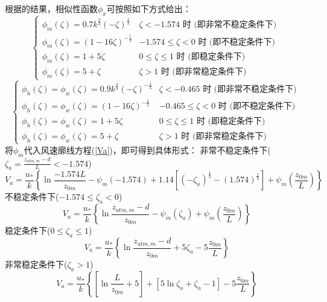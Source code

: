 根据\citet{zeng1998effect}的结果，相似性函数$\phi_x$可按照如下方式给出：
\begin{equation}
\left\{\begin{array}{lr}\phi_{m}(\zeta)=0.7 k^{\frac{2}{3}}(-\zeta)^{\frac{1}{3}} & \zeta<-1.574 \text { 时 (即非常不稳定条件下) } \\
      \phi_{m}(\zeta)=(1-16 \zeta)^{-\frac{1}{4}} & -1.574 \leq \zeta<0 \text { 时 (即不稳定条件下) } \\
       \phi_{m}(\zeta)=1+5 \zeta & 0 \leq \zeta \leq 1 \text { 时 (即稳定条件下) } \\ 
       \phi_{m}(\zeta)=5+\zeta & \zeta>1 \text { 时 (即非常稳定条件下) }\end{array}\right.
\end{equation}
\begin{equation}
\left\{\begin{array}{lr}\phi_{h}(\zeta)=\phi_{w}(\zeta)=0.9 k^{\frac{4}{3}}(-\zeta)^{-\frac{1}{3}} & \zeta<-0.465 \text { 时 (即非常不稳定条件下) } \\ 
     \phi_{h}(\zeta)=\phi_{w}(\zeta)=(1-16 \zeta)^{-\frac{1}{2}} & -0.465 \leq \zeta<0 \text { 时 (即不稳定条件下) } \\ 
     \phi_{h}(\zeta)=\phi_{w}(\zeta)=1+5 \zeta & 0 \leq \zeta \leq 1 \text { 时 (即稳定条件下) } \\
      \phi_{h}(\zeta)=\phi_{w}(\zeta)=5+\zeta & \zeta>1 \text { 时 (即非常稳定条件下) }\end{array}\right.
\end{equation}
将$\phi_m$代入风速廓线方程(\ref{Va})，即可得到具体形式：
非常不稳定条件下($\zeta_a=\frac{z_{atm,m}-d}{L}<-1.574$)
\begin{equation}
V_{a}=\frac{u_{*}}{k}\left\{\ln \frac{-1.574 L}{z_{0 m}}-\psi_{m}(-1.574)+
1.14\left[\left(-\zeta_{a}\right)^{\frac{1}{3}}-(1.574)^{\frac{1}{3}}\right]+\psi_{m}\left(\frac{z_{0 m}}{L}\right)\right\}
\end{equation}
不稳定条件下($-1.574\le\zeta_a<0$)
\begin{equation}
V_{a}=\frac{u_{*}}{k}\left\{\ln \frac{z_{atm, m}-d}{z_{0 m}}-\psi_{m}\left(\zeta_{a}\right)+\psi_{m}\left(\frac{z_{0 m}}{L}\right)\right\}
\end{equation}
稳定条件下($0\le\zeta_a\le1$)
\begin{equation}
V_{a}=\frac{u_{*}}{k}\left\{\ln \frac{z_{atm, m}-d}{z_{0 m}}+5 \zeta_{a}-5 \frac{z_{0 m}}{L}\right\}
\end{equation}
非常稳定条件下($\zeta_a>1$)
\begin{equation}
V_{a}=\frac{u_{*}}{k}\left\{\left[\ln \frac{L}{z_{0 m}}+5\right]+\left[5 \ln \zeta_{a}+\zeta_{a}-1\right]-5 \frac{z_{0 m}}{L}\right\}
\end{equation}
